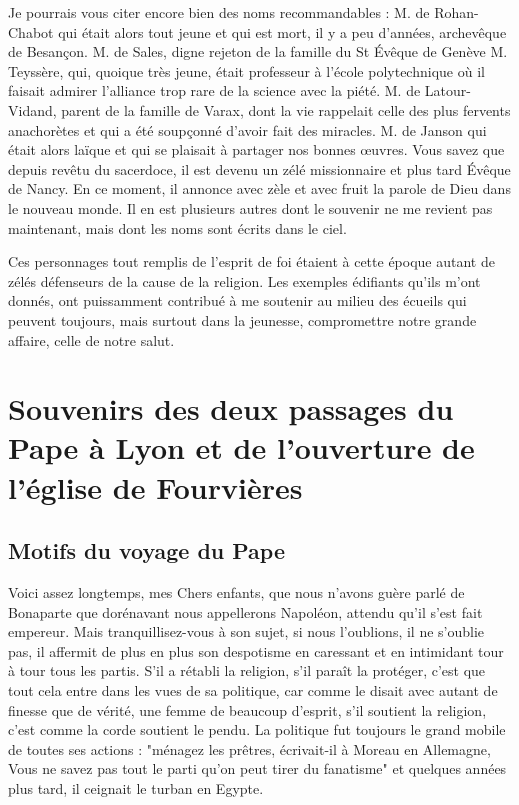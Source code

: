\documentclass[11pt,a4paper]{report}
\begin{document}
Je pourrais vous citer encore bien des noms recommandables : M. de Rohan-Chabot qui était alors tout jeune et qui est mort, il y a peu d'années, archevêque de Besançon. M. de Sales, digne rejeton de la famille du St Évêque de Genève M. Teyssère, qui, quoique très jeune, était professeur à l'école polytechnique où il faisait admirer l'alliance trop rare de la science avec la piété. M. de Latour-Vidand, parent de la famille de Varax, dont la vie rappelait celle des plus fervents anachorètes et qui a été soupçonné d'avoir fait des miracles. M. de Janson qui était alors laïque et qui se plaisait à partager nos bonnes œuvres. Vous savez que depuis revêtu du sacerdoce, il est devenu un zélé missionnaire et plus tard Évêque de Nancy. En ce moment, il annonce avec zèle et avec fruit la parole de Dieu dans le nouveau monde. Il en est plusieurs autres dont le souvenir ne me revient pas maintenant, mais dont les noms sont écrits dans le ciel.

Ces personnages tout remplis de l'esprit de foi étaient à cette époque autant de zélés défenseurs de la cause de la religion. Les exemples édifiants qu'ils m'ont donnés, ont puissamment contribué à me soutenir au milieu des écueils qui peuvent toujours, mais surtout dans la jeunesse, compromettre notre grande affaire, celle de notre salut.

\chapter{Souvenirs des deux passages du Pape à Lyon et de l'ouverture de l'église de Fourvières}

\section*{Motifs du voyage du Pape}

Voici assez longtemps, mes Chers enfants, que nous n'avons guère parlé de Bonaparte que dorénavant nous appellerons Napoléon, attendu qu'il s'est fait empereur. Mais tranquillisez-vous à son sujet, si nous l'oublions, il ne s'oublie pas, il affermit de plus en plus son despotisme en caressant et en intimidant tour à tour tous les partis. S'il a rétabli la religion, s'il paraît la protéger, c'est que tout cela entre dans les vues de sa politique, car comme le disait avec autant de finesse que de vérité, une femme de beaucoup d'esprit, s'il soutient la religion, c'est comme la corde soutient le pendu. La politique fut toujours le grand mobile de toutes ses actions : "ménagez les prêtres, écrivait-il à Moreau en Allemagne, Vous ne savez pas tout le parti qu'on peut tirer du fanatisme" et quelques années plus tard, il ceignait le turban en Egypte.
\end{document}
